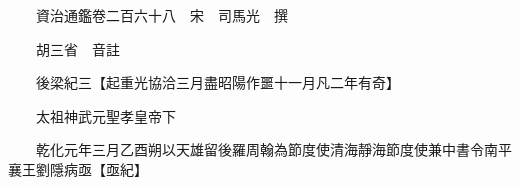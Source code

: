 










 


 
 


 

  
  
  
  
  





  
  
  
  
  
 
  

  

  
  
  



  

 
 

  
   




  

  
  


  　　資治通鑑卷二百六十八　宋　司馬光　撰

　　胡三省　音註

　　後梁紀三【起重光協洽三月盡昭陽作噩十一月凡二年有奇】

　　太祖神武元聖孝皇帝下

　　乾化元年三月乙酉朔以天雄留後羅周翰為節度使清海靜海節度使兼中書令南平襄王劉隱病亟【亟紀】

